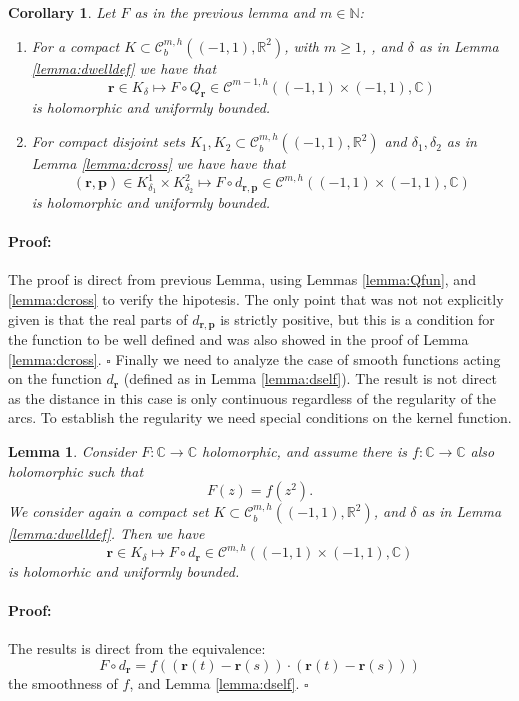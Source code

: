 \documentclass{article}
\newtheorem{lemma}[theorem]{Lemma}
\newtheorem{corollary}[theorem]{Corollary}
\newenvironment{proof}{\paragraph{Proof:}}{\hfill$\square$}
\newcommand{\IC}{{\mathbb C}}
\newcommand{\IN}{{\mathbb N}}
\newcommand{\IR}{{\mathbb R}}
\newcommand{\bp}{{\bm p}}
\newcommand{\cmspaceh}[4]{\mathcal{C}^{#1,#2} \left( #3, #4 \right)}
\newcommand{\rgeoh}[2]{\mathcal{C}_b^{#1,#2}\left( (-1,1), \IR^2 \right)}
\newcommand{\br}{\bm{r}}
\begin{document}
\begin{corollary}
\label{cor:smoothcomp}
Let $F$ as in the previous lemma and $m \in \IN$: 
\begin{enumerate}
\item 
For a compact $K \subset \rgeoh{m}{h}$, with $m \geq 1$, , and $\delta$ as in Lemma \ref{lemma:dwelldef} we have that 
$$\br \in K_\delta \mapsto F \circ Q_{\br} \in \cmspaceh{m-1}{h}{(-1,1)\times(-1,1)}{\IC}$$
is holomorphic and uniformly bounded. 
\item 
For compact disjoint sets $K_1,K_2 \subset  \rgeoh{m}{h}$ and $\delta_1, \delta_2$ as in Lemma \ref{lemma:dcross} we have have that 
$$(\br,\bp) \in K^1_{\delta_1} \times K^2_{\delta_2} \mapsto F \circ d_{\br,\bp} \in \cmspaceh{m}{h}{(-1,1)\times(-1,1)}{\IC}$$
is holomorphic and uniformly bounded.
\end{enumerate}
\end{corollary}
\begin{proof}
The proof is direct from previous Lemma, using Lemmas \ref{lemma:Qfun}, and \ref{lemma:dcross} to verify the hipotesis. The only point that was not not explicitly given is that the real parts of $d_{\br,\bp}$ is strictly positive, but this is a condition for the function to be well defined and was also showed in the proof of Lemma \ref{lemma:dcross}.
\end{proof}
Finally we need to analyze the case of smooth functions acting on the function $d_{\br}$ (defined as in Lemma \ref{lemma:dself}). The result is not direct as the distance in this case is only continuous regardless of the regularity of the arcs. To establish the regularity we need special conditions on the kernel function. 
\begin{lemma}
\label{lemma:selfkernell}
Consider $F :\IC \rightarrow \IC$ holomorphic, and assume there is $f : \IC \rightarrow \IC$ also holomorphic such that
$$F(z) = f(z^2).$$ 
We consider again a compact set $K \subset \rgeoh{m}{h}$, and $\delta$ as in Lemma \ref{lemma:dwelldef}. Then we have 
$$\br \in K_\delta \mapsto F\circ d_{\br} \in \cmspaceh{m}{h}{(-1,1)\times(-1,1)}{\IC}$$
is holomorhic and uniformly bounded. 
\end{lemma}
\begin{proof}
The results is direct from the equivalence: $$F\circ d_{\br} = f( (\br(t)-\br(s)) \cdot (\br(t)-\br(s)))$$ the smoothness of $f$, and Lemma \ref{lemma:dself}. 
\end{proof}
\end{document}
